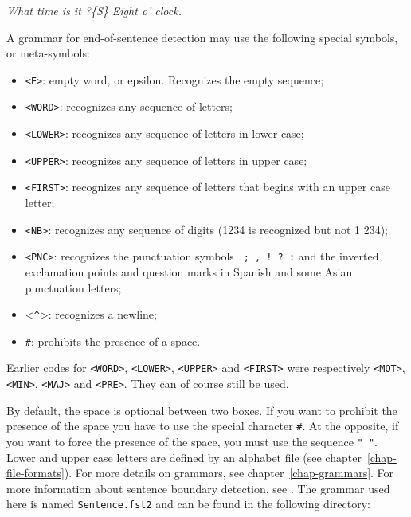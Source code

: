 \bigskip
\textit{What time is it ?\{S\} Eight o' clock.}

\bigskip
\noindent A  grammar for end-of-sentence detection may use the following
special symbols, or meta-symbols:

\index{\verbc{<^>}}\index{\verbt{\#}}
\begin{itemize}
  \item \verb+<E>+: empty word, or epsilon. Recognizes the empty sequence;
  \item \verb+<WORD>+: recognizes any sequence of letters;
  \item \verb+<LOWER>+: recognizes any sequence of letters in lower case;
  \item \verb+<UPPER>+: recognizes any sequence of letters in upper case;
  \item \verb+<FIRST>+: recognizes any sequence of letters that begins with an upper case letter;
  \item \verb+<NB>+: recognizes any sequence of digits (1234 is recognized but not 1
  234);
  \item \verb+<PNC>+: recognizes the punctuation symbols \verb+ ; , ! ? :+ and the
  inverted exclamation points and question marks in Spanish and some Asian
  punctuation letters;
  \item <\verb+^+>: recognizes a newline;
  \item \verb+#+:
  prohibits the presence of a space.
\end{itemize}

\noindent Earlier codes for \verb+<WORD>+, \verb+<LOWER>+, \verb+<UPPER>+ and \verb+<FIRST>+
were respectively \verb+<MOT>+, \verb+<MIN>+, \verb+<MAJ>+ and \verb+<PRE>+.
They can of course still be used.

\bigskip
\noindent By default, the space is optional between two boxes. If you want to prohibit the
presence of the space you have to use the special character  \verb+#+. At the
opposite, if you want to force the presence of the space, you must use the
sequence \verb+" "+. Lower and upper case letters are defined by an alphabet
file (see chapter~\ref{chap-file-formats}). For
more details on grammars, see chapter~\ref{chap-grammars}.
For more information about sentence boundary detection, see
\cite{ameliorer-decoupage-en-phrases}. The grammar used here is named
\verb+Sentence.fst2+ and can be found in the following directory:

